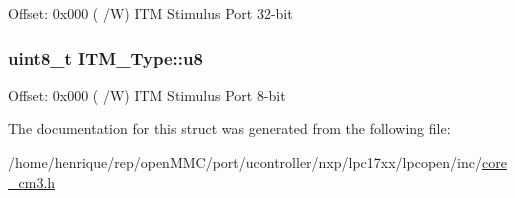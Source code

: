 Offset\-: 0x000 ( /\-W) I\-T\-M Stimulus Port 32-\/bit \hypertarget{structITM__Type_abea77b06775d325e5f6f46203f582433}{
\subsubsection[{u8}]{ uint8\-\_\-t I\-T\-M\-\_\-\-Type\-::u8}}\label{structITM__Type_abea77b06775d325e5f6f46203f582433}
Offset\-: 0x000 ( /\-W) I\-T\-M Stimulus Port 8-\/bit 

The documentation for this struct was generated from the following file\-:\begin{DoxyCompactItemize}
\item 
/home/henrique/rep/open\-M\-M\-C/port/ucontroller/nxp/lpc17xx/lpcopen/inc/\hyperlink{core__cm3_8h}{core\-\_\-cm3.\-h}\end{DoxyCompactItemize}
